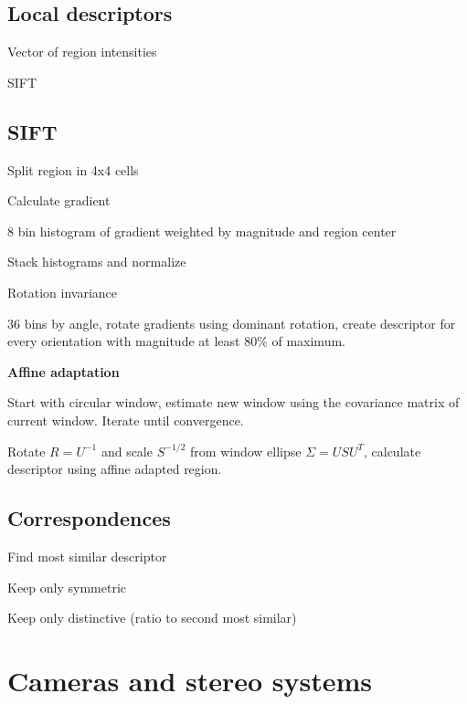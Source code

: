 \documentclass{article}
\begin{document}
\begin{multicols*}{2}
{\subsection{Local descriptors}

\begin{compactitem}
	\item Vector of region intensities
	\item SIFT
\end{compactitem}

\subsection{SIFT}

\begin{compactenum}
	\item Split region in 4x4 cells
	\item Calculate gradient
	\item 8 bin histogram of gradient weighted by magnitude and region center
	\item Stack histograms and normalize
\end{compactenum}

Rotation invariance

36 bins by angle, rotate gradients using dominant rotation, create descriptor for every orientation with magnitude at least 80\% of maximum.

\textbf{Affine adaptation}

Start with circular window, estimate new window using the covariance matrix of current window. Iterate until convergence.

Rotate $R=U^{-1}$ and scale $S^{-1/2}$ from window ellipse $\Sigma = USU^T$, calculate descriptor using affine adapted region.

\subsection{Correspondences}

\begin{compactitem}
	\item Find most similar descriptor
	\item Keep only symmetric
	\item Keep only distinctive (ratio to second most similar)
\end{compactitem}

\section{Cameras and stereo systems}

}
\end{multicols*}
\end{document}
